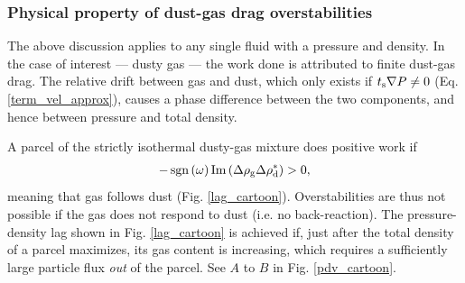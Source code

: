 \subsubsection{Physical property of dust-gas drag overstabilities}  




The above discussion applies to any single fluid with a pressure and
density. In the case of interest --- dusty gas --- the work done 
is attributed to finite dust-gas drag. 
The relative 
drift between gas and dust{, which only exists if $t_\mathrm{s}\nabla P \neq 0$ (Eq. \ref{term_vel_approx}),} causes a phase difference between the two
components, and hence between pressure and total density. 

A parcel of the strictly isothermal dusty-gas mixture does 
positive work if  
\begin{align*}
-\operatorname{sgn}\left(\omega\right)\operatorname{Im}\left(\Delta\rho_\mathrm{g}\Delta\rho_\mathrm{d}^*\right)>0,
\end{align*}
meaning that gas follows dust (Fig. \ref{lag_cartoon}). Overstabilities 
are thus not possible if the gas does not respond to dust 
(i.e. no back-reaction).%
The pressure-density lag shown in
Fig. \ref{lag_cartoon} is achieved if, just after the total density of a 
parcel maximizes, its gas content
is increasing, which requires a sufficiently large
particle flux \emph{out} of the parcel. See $A$ to $B$ in 
Fig. \ref{pdv_cartoon}. 

